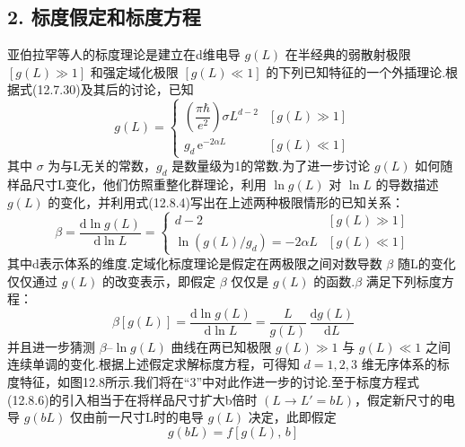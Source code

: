\subsection*{2. 标度假定和标度方程}

亚伯拉罕等人的标度理论是建立在d维电导 $g\left(L\right)$ 在半经典的弱散射极限 $\left[g\left(L\right)\gg1\right]$ 和强定域化极限 $\left[g\left(L\right)\ll1\right]$ 的下列已知特征的一个外插理论.根据式(12.7.30)及其后的讨论，已知
\begin{equation}
  g\left(L\right)=
  \begin{cases}
    \left(\dfrac{\pi\hbar}{e^{2}}\right)\sigma L^{d-2} & \left[g\left(L\right)\gg1\right]\\[0.8em]
    g_{d}\,\mathrm{e}^{-2\alpha L} & \left[g\left(L\right)\ll1\right]
  \end{cases}
\end{equation}
其中 $\sigma$ 为与L无关的常数，$g_{d}$ 是数量级为1的常数.为了进一步讨论 $g\left(L\right)$ 如何随样品尺寸L变化，他们仿照重整化群理论，利用 $\ln g\left(L\right)$ 对 $\ln L$ 的导数描述 $g\left(L\right)$ 的变化，并利用式(12.8.4)写出在上述两种极限情形的已知关系：
\begin{equation}
  \beta=\frac{\mathrm{d}\ln g\left(L\right)}{\mathrm{d}\ln L}
  =\begin{cases}
    d-2 & \left[g\left(L\right)\gg1\right]\\
    \ln\left(g\left(L\right)/g_{d}\right)=-2\alpha L & \left[g\left(L\right)\ll1\right]
  \end{cases}
\end{equation}
其中d表示体系的维度.定域化标度理论是假定在两极限之间对数导数 $\beta$ 随L的变化仅仅通过 $g\left(L\right)$ 的改变表示，即假定 $\beta$ 仅仅是 $g\left(L\right)$ 的函数.$\beta$ 满足下列标度方程：
\begin{equation}
  \beta\left[g\left(L\right)\right]=\frac{\mathrm{d}\ln g\left(L\right)}{\mathrm{d}\ln L}
  =\frac{L}{g\left(L\right)}\,\frac{\mathrm{d}g\left(L\right)}{\mathrm{d}L}
\end{equation}
并且进一步猜测 $\beta$--$\ln g\left(L\right)$ 曲线在两已知极限 $g\left(L\right)\gg1$ 与 $g\left(L\right)\ll1$ 之间连续单调的变化.根据上述假定求解标度方程，可得知 $d=1,2,3$ 维无序体系的标度特征，如图12.8所示.我们将在“3”中对此作进一步的讨论.至于标度方程式(12.8.6)的引入相当于在将样品尺寸扩大b倍时 $\left(L\rightarrow L'=bL\right)$，假定新尺寸的电导 $g\left(bL\right)$ 仅由前一尺寸L时的电导 $g\left(L\right)$ 决定，此即假定
\begin{equation}
  g\left(bL\right)=f\left[g\left(L\right),\,b\right]
\end{equation}

